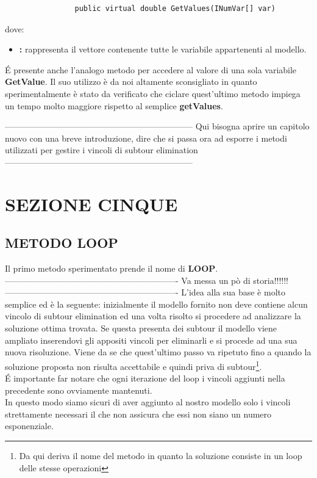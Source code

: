 \documentclass[11pt]{article}
\begin{document}
\begin{lstlisting}
                public virtual double GetValues(INumVar[] var)
\end{lstlisting}

dove:

\begin{itemize}
\item \textbf: rappresenta il vettore contenente tutte le variabile appartenenti al modello.
\end{itemize}

\'E presente anche l'analogo metodo per accedere al valore di una sola variabile \textbf{GetValue}. Il suo utilizzo è da noi altamente sconsigliato in quanto sperimentalmente è stato da verificato che ciclare quest'ultimo metodo impiega un tempo molto maggiore rispetto al semplice \textbf{getValues}.



------------------------------------------------------------------
Qui bisogna aprire un capitolo nuovo con una breve introduzione, dire che si passa ora ad esporre i metodi utilizzati per gestire i vincoli di subtour elimination
------------------------------------------------------------------

\section*{SEZIONE CINQUE}

\subsection*{METODO LOOP}

Il primo metodo sperimentato prende il nome di \textbf{LOOP}.
-------------------------------------------------------------
Va messa un pò di storia!!!!!!
-------------------------------------------------------------
L'idea alla sua base è molto semplice ed è la seguente: inizialmente il modello fornito non deve contiene alcun vincolo di subtour elimination ed una volta risolto si procedere ad analizzare la soluzione ottima trovata. Se questa presenta dei subtour il modello viene ampliato inserendovi gli appositi vincoli per eliminarli e si procede ad una sua nuova risoluzione. Viene da se che quest'ultimo passo va ripetuto fino a quando la soluzione proposta non risulta accettabile e quindi priva di subtour\footnote{Da qui deriva il nome del metodo in quanto la soluzione consiste in un loop delle stesse operazioni}.\\\'E importante far notare che ogni iterazione del loop i vincoli aggiunti nella precedente sono ovviamente mantenuti.\\
In questo modo siamo sicuri di aver aggiunto al nostro modello solo i vincoli strettamente necessari il che non assicura che essi non siano un numero esponenziale.\\
\end{document}
